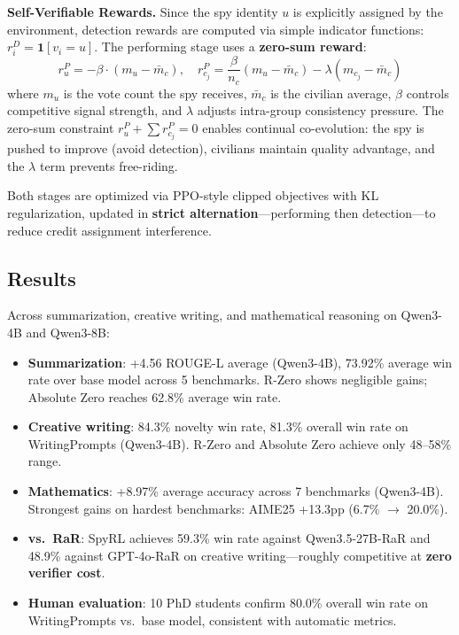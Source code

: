 \documentclass[11pt,a4paper]{article}
\begin{document}
\textbf{Self-Verifiable Rewards.} Since the spy identity $u$ is explicitly assigned by the environment, detection rewards are computed via simple indicator functions: $r_i^D = \mathbf{1}[v_i = u]$. The performing stage uses a \textbf{zero-sum reward}:
\begin{equation}
    r_u^P = -\beta \cdot (m_u - \bar{m}_c), \quad
    r_{c_j}^P = \frac{\beta}{n_c}(m_u - \bar{m}_c) - \lambda(m_{c_j} - \bar{m}_c)
\end{equation}
where $m_u$ is the vote count the spy receives, $\bar{m}_c$ is the civilian average, $\beta$ controls competitive signal strength, and $\lambda$ adjusts intra-group consistency pressure. The zero-sum constraint $r_u^P + \sum r_{c_j}^P = 0$ enables continual co-evolution: the spy is pushed to improve (avoid detection), civilians maintain quality advantage, and the $\lambda$ term prevents free-riding.

Both stages are optimized via PPO-style clipped objectives with KL regularization, updated in \textbf{strict alternation}---performing then detection---to reduce credit assignment interference.

\subsection{Results}
Across summarization, creative writing, and mathematical reasoning on Qwen3-4B and Qwen3-8B:
\begin{itemize}
    \item \textbf{Summarization}: +4.56 ROUGE-L average (Qwen3-4B), 73.92\% average win rate over base model across 5 benchmarks. R-Zero shows negligible gains; Absolute Zero reaches 62.8\% average win rate.
    \item \textbf{Creative writing}: 84.3\% novelty win rate, 81.3\% overall win rate on WritingPrompts (Qwen3-4B). R-Zero and Absolute Zero achieve only 48--58\% range.
    \item \textbf{Mathematics}: +8.97\% average accuracy across 7 benchmarks (Qwen3-4B). Strongest gains on hardest benchmarks: AIME25 +13.3pp (6.7\% $\to$ 20.0\%).
    \item \textbf{vs.\ RaR}: SpyRL achieves 59.3\% win rate against Qwen3.5-27B-RaR and 48.9\% against GPT-4o-RaR on creative writing---roughly competitive at \textbf{zero verifier cost}.
    \item \textbf{Human evaluation}: 10 PhD students confirm 80.0\% overall win rate on WritingPrompts vs.\ base model, consistent with automatic metrics.
\end{itemize}
\end{document}
